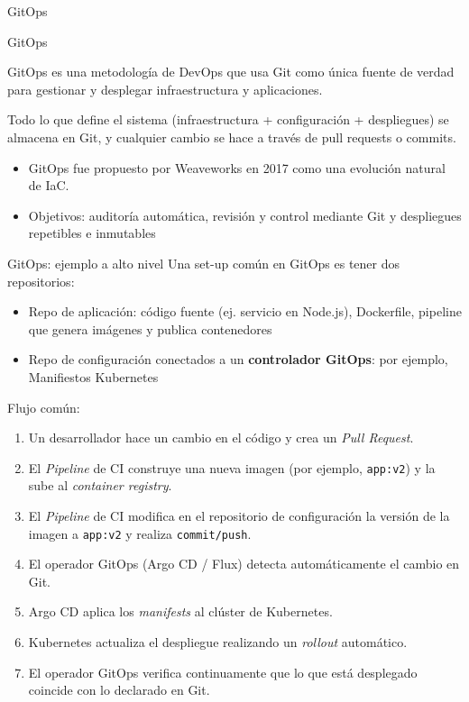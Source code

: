 \documentclass{beamer}
\begin{document}
\begin{frame}{GitOps}

\begin{block}{GitOps}

GitOps es una metodología de DevOps que usa Git como única fuente de verdad para gestionar y desplegar infraestructura y aplicaciones.

Todo lo que define el sistema (infraestructura + configuración + despliegues) se almacena en Git, y cualquier cambio se hace a través de pull requests o commits.

\end{block}

\begin{itemize}
    \item GitOps fue propuesto por Weaveworks en 2017 como una evolución natural de IaC.
    \item Objetivos: auditoría automática, revisión y control mediante Git y despliegues repetibles e inmutables
\end{itemize}
    
\end{frame}

\begin{frame}{GitOps: ejemplo a alto nivel}
Una set-up común en GitOps es tener dos repositorios:
\begin{itemize}
    \item Repo de aplicación: código fuente (ej. servicio en Node.js), Dockerfile, pipeline que genera imágenes y publica contenedores
    \item Repo de configuración conectados a un \textbf{controlador GitOps}: por ejemplo, Manifiestos Kubernetes
    
\end{itemize}

\pause

Flujo común:

{\scriptsize
\begin{enumerate}
    \item Un desarrollador hace un cambio en el código y crea un \textit{Pull Request}.
    \item El \textit{Pipeline} de CI construye una nueva imagen (por ejemplo, \texttt{app:v2}) y la sube al \textit{container registry}.
    \item El \textit{Pipeline} de CI modifica en el repositorio de configuración la versión de la imagen a \texttt{app:v2} y realiza \texttt{commit/push}.
    \item El operador GitOps (Argo CD / Flux) detecta automáticamente el cambio en Git.
    \item Argo CD aplica los \textit{manifests} al clúster de Kubernetes.
    \item Kubernetes actualiza el despliegue realizando un \textit{rollout} automático.
    \item El operador GitOps verifica continuamente que lo que está desplegado coincide con lo declarado en Git.
\end{enumerate}}

\end{frame}
\end{document}
